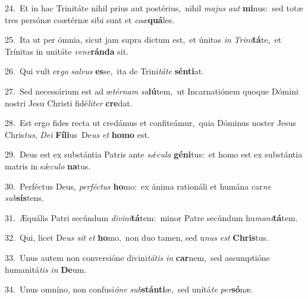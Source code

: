 {\numbfont\textcolor{\numbcolor}{24.}}~Et in hac Trinitáte nihil prius aut postérius,~\dagger nihil \textit{ma}\-\textit{jus} \textit{aut} \textbf{mi}\-nus:~\star sed totæ tres persónæ coætérnæ sibi sunt et \textit{co}\-\textit{æ}\textbf{quá}les.\par
{\numbfont\textcolor{\numbcolor}{25.}}~Ita ut per ómnia, sicut jam supra dictum est,~\dagger et únitas \textit{in} \textit{Tri}\-\textit{ni}\textbf{tá}te,~\star et Trínitas in unitáte \textit{ve}\-\textit{ne}\textbf{rán}\textbf{da} sit.\par
{\numbfont\textcolor{\numbcolor}{26.}}~Qui vult er\textit{go} \textit{sal}\-\textit{vus} \textbf{es}\-se,~\star ita de Trini\-\textit{tá}\-\textit{te} \textbf{sén}\-\textbf{ti}at.\par
{\numbfont\textcolor{\numbcolor}{27.}}~Sed necessárium est ad æ\-\textit{tér}\-\textit{nam} \textit{sa}\-\textbf{lú}tem,~\star ut Incarnatiónem quoque Dómini nostri Jesu Christi fidé\-\textit{li}\-\textit{ter} \textbf{cre}\-dat.\par
{\numbfont\textcolor{\numbcolor}{28.}}~Est ergo fides recta ut credámus et confiteámur,~\dagger quia Dóminus noster Jesus Chris\-\textit{tus}\-, \textit{De}\-\textit{i} \textbf{Fí}\-\textbf{li}us~\star De\textit{us} \textit{et} \textbf{ho}\-\textbf{mo} est.\par
{\numbfont\textcolor{\numbcolor}{29.}}~Deus est ex substántia Patris ante \textit{sǽ}\-\textit{cu}\textit{la} \textbf{gé}\-\textbf{ni}tus:~\star et homo est ex substántia matris in sǽ\-\textit{cu}\-\textit{lo} \textbf{na}\-tus.\par
{\numbfont\textcolor{\numbcolor}{30.}}~Perféctus Deus, \textit{per}\-\textit{féc}\textit{tus} \textbf{ho}\-mo:~\star ex ánima rationáli et humána car\textit{ne} \textit{sub}\-\textbf{sís}tens.\par
{\numbfont\textcolor{\numbcolor}{31.}}~Æquális Patri secúndum \textit{di}\-\textit{vi}\textit{ni}\textbf{tá}tem:~\star minor Patre secúndum hu\-\textit{ma}\-\textit{ni}\textbf{tá}tem.\par
{\numbfont\textcolor{\numbcolor}{32.}}~Qui, licet De\textit{us} \textit{sit} \textit{et} \textbf{ho}\-mo,~\star non duo tamen, sed u\textit{nus} \textit{est} \textbf{Chris}\-tus.\par
{\numbfont\textcolor{\numbcolor}{33.}}~Unus autem non conversióne divini\-\textit{tá}\-\textit{tis} \textit{in} \textbf{car}\-nem,~\star sed assumptióne humanitá\textit{tis} \textit{in} \textbf{De}\-um.\par
{\numbfont\textcolor{\numbcolor}{34.}}~Unus omníno, non confusi\-\textit{ó}\-\textit{ne} \textit{sub}\-\textbf{stán}\textbf{ti}æ,~\star sed unitá\textit{te} \textit{per}\-\textbf{só}næ.\par
